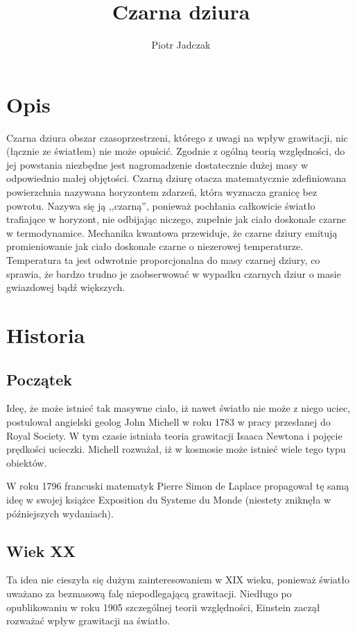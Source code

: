 \documentclass[12pt]{article}
\title{Czarna dziura}
\author{Piotr Jadczak}
\begin{document}
\maketitle
\section{Opis}
Czarna dziura \textendash{} obszar czasoprzestrzeni, kt\'{o}rego z uwagi na wp\l{}yw grawitacji, nic (\l{}\k{a}cznie ze \'{s}wiat\l{}em) nie mo\.{z}e opu\'{s}ci\'{c}. Zgodnie z og\'{o}ln\k{a} teori\k{a} wzgl\k{e}dno\'{s}ci, do jej powstania niezb\k{e}dne jest nagromadzenie dostatecznie du\.{z}ej masy w odpowiednio ma\l{}ej obj\k{e}to\'{s}ci. Czarn\k{a} dziur\k{e} otacza matematycznie zdefiniowana powierzchnia nazywana horyzontem zdarze\'{n}, kt\'{o}ra wyznacza granic\k{e} bez powrotu. Nazywa si\k{e} j\k{a} ,,czarn\k{a}\textquotedblright{}, poniewa\.{z} poch\l{}ania ca\l{}kowicie \'{s}wiat\l{}o trafiaj\k{a}ce w horyzont, nie odbijaj\k{a}c niczego, zupe\l{}nie jak cia\l{}o doskonale czarne w termodynamice. Mechanika kwantowa przewiduje, \.{z}e czarne dziury emituj\k{a} promieniowanie jak cia\l{}o doskonale czarne o niezerowej temperaturze. Temperatura ta jest odwrotnie proporcjonalna do masy czarnej dziury, co sprawia, \.{z}e bardzo trudno je zaobserwowa\'{c} w wypadku czarnych dziur o masie gwiazdowej b\k{a}d\'{z} wi\k{e}kszych.
\newpage
\section{Historia}
\subsection{Pocz\k{a}tek}
Ide\k{e}, \.{z}e mo\.{z}e istnie\'{c} tak masywne cia\l{}o, i\.{z} nawet \'{s}wiat\l{}o nie mo\.{z}e z niego uciec, postulowa\l{} angielski geolog John Michell w roku 1783 w pracy przes\l{}anej do Royal Society. W tym czasie istnia\l{}a teoria grawitacji Isaaca Newtona i poj\k{e}cie pr\k{e}dko\'{s}ci ucieczki. Michell rozwa\.{z}a\l{}, i\.{z} w kosmosie mo\.{z}e istnie\'{c} wiele tego typu obiekt\'{o}w.

W roku 1796 francuski matematyk Pierre Simon de Laplace propagowa\l{} t\k{e} sam\k{a} ide\k{e} w swojej ksi\k{a}\.{z}ce Exposition du Systeme du Monde (niestety znikn\k{e}\l{}a w p\'{o}\'{z}niejszych wydaniach).
\subsection{Wiek XX}
Ta idea nie cieszy\l{}a si\k{e} du\.{z}ym zainteresowaniem w XIX wieku, poniewa\.{z} \'{s}wiat\l{}o uwa\.{z}ano za bezmasow\k{a} fal\k{e} niepodlegaj\k{a}c\k{a} grawitacji. Nied\l{}ugo po opublikowaniu w roku 1905 szczeg\'{o}lnej teorii wzgl\k{e}dno\'{s}ci, Einstein zacz\k{a}\l{} rozwa\.{z}a\'{c} wp\l{}yw grawitacji na \'{s}wiat\l{}o.
\end{document}
